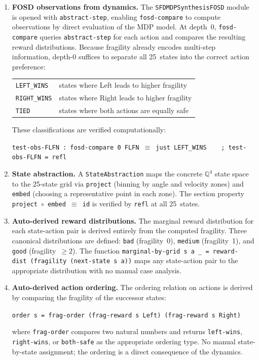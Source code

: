 \documentclass[9pt,a4paper]{article}
\theoremstyle{plain}
\theoremstyle{definition}
\theoremstyle{remark}
\begin{document}
\begin{enumerate}
\item \textbf{FOSD observations from dynamics.}  The \texttt{SFDMDPSynthesisFOSD} module is opened with \texttt{abstract-step}, enabling \texttt{fosd-compare} to compute observations by direct evaluation of the MDP model.  At depth~0, \texttt{fosd-compare} queries \texttt{abstract-step} for each action and compares the resulting reward distributions.  Because fragility already encodes multi-step information, depth-0 suffices to separate all 25~states into the correct action preference:
\begin{center}
\begin{tabular}{ll}
\texttt{LEFT\_WINS}  & states where Left leads to higher fragility \\
\texttt{RIGHT\_WINS} & states where Right leads to higher fragility \\
\texttt{TIED}        & states where both actions are equally safe
\end{tabular}
\end{center}
These classifications are verified computationally:
\begin{center}
\texttt{test-obs-FLFN~:~fosd-compare~0~FLFN~$\equiv$~just~LEFT\_WINS~~~~;~test-obs-FLFN~=~refl}
\end{center}

\item \textbf{State abstraction.}  A \texttt{StateAbstraction} maps the concrete $\mathbb{Q}^4$ state space to the 25-state grid via \texttt{project} (binning by angle and velocity zones) and \texttt{embed} (choosing a representative point in each zone).  The section property \texttt{project~$\circ$~embed~$\equiv$~id} is verified by \texttt{refl} at all 25~states.

\item \textbf{Auto-derived reward distributions.}  The marginal reward distribution for each state-action pair is derived entirely from the computed fragility.  Three canonical distributions are defined: \texttt{bad} (fragility~0), \texttt{medium} (fragility~1), and \texttt{good} (fragility~$\ge 2$).  The function \texttt{marginal-by-grid~s~a~\_~=~reward-dist~(fragility~(next-state~s~a))} maps any state-action pair to the appropriate distribution with no manual case analysis.

\item \textbf{Auto-derived action ordering.}  The ordering relation on actions is derived by comparing the fragility of the successor states:
\begin{center}
\texttt{order~s~=~frag-order~(frag-reward~s~Left)~(frag-reward~s~Right)}
\end{center}
where \texttt{frag-order} compares two natural numbers and returns \texttt{left-wins}, \texttt{right-wins}, or \texttt{both-safe} as the appropriate ordering type.  No manual state-by-state assignment; the ordering is a direct consequence of the dynamics.


\end{enumerate}
\end{document}
